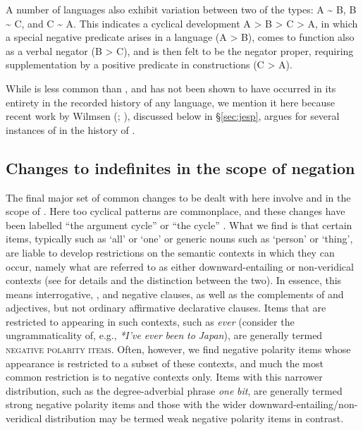 \documentclass[output=paper]{langsci/langscibook}
\begin{document}
A number of languages also exhibit variation between two of the types: A {\textasciitilde} B, B {\textasciitilde} C, and C {\textasciitilde} A. This indicates a cyclical development A > B > C > A, in which a special negative  predicate arises in a language (A > B), comes to function also as a verbal negator (B > C), and is then felt to be the negator proper, requiring supplementation by a positive  predicate in  constructions (C > A).

While  is less common than , and has not been shown to have occurred in its entirety in the recorded history of any language, we mention it here because recent work by Wilmsen (\citeyear[174–176]{Wilmsen2014}; \citeyear{Wilmsen2016}), discussed below in §\ref{sec:jesp}, argues for several instances of  in the history of .



\subsection{Changes to indefinites in the scope of negation}\label{sec:ind}


The final major set of common changes to be dealt with here involve  and  in the scope of . Here too cyclical patterns are commonplace, and these changes have been labelled “the argument cycle” \citep{Ladusaw1993} or “the  cycle” \citep{Willis2011}. What we find is that certain items, typically  such as ‘all’ or ‘one’ or generic nouns such as ‘person’ or ‘thing’, are liable to develop restrictions on the semantic contexts in which they can occur, namely what are referred to as either downward-entailing or non-veridical contexts (see \citealt{Giannakidou1998} for details and the distinction between the two). In essence, this means interrogative, , and negative clauses, as well as the complements of  and  adjectives, but not ordinary affirmative declarative clauses. Items that are restricted to appearing in such contexts, such as  \textit{ever} (consider the ungrammaticality of, e.g., \textit{*I’ve} \textit{ever} \textit{been} \textit{to} \textit{Japan}), are generally termed \textsc{negative} \textsc{polarity} \textsc{items}. Often, however, we find negative polarity items whose appearance is restricted to a subset of these contexts, and much the most common restriction is to negative contexts only. Items with this narrower distribution, such as the  degree-adverbial phrase \textit{one} \textit{bit}, are generally termed strong negative polarity items and those with the wider downward-entailing/non-veridical distribution may be termed weak negative polarity items in contrast.
\end{document}
